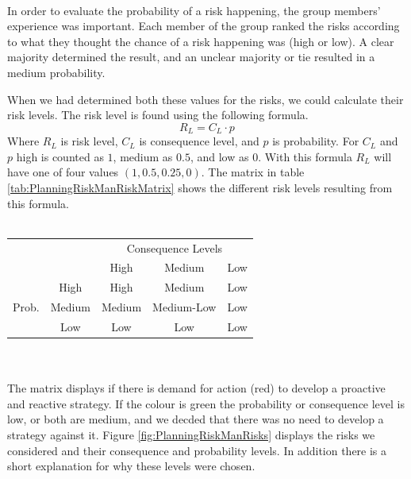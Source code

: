 \\%
In order to evaluate the probability of a risk happening, the group members' experience was important. Each member of the group ranked the risks according to what they thought the chance of a risk happening was (high or low). A clear majority determined the result, and an unclear majority or tie resulted in a medium probability.


When we had determined both these values for the risks, we could calculate their risk levels. The risk level is found using the following formula.
\begin{equation}
R_L = C_L \cdot p
\end{equation}
Where \( R_L \) is risk level, \( C_L \) is consequence level, and \( p \) is probability. For \( C_L \) and \( p \) high is counted as \( 1 \), medium as \( 0.5 \), and low as \( 0 \). With this formula \( R_L \) will have one of four values \( (1, 0.5, 0.25, 0) \). The matrix in table \ref{tab:PlanningRiskManRiskMatrix} shows the different risk levels resulting from this formula.\\%
\\%
\begin{minipage}{\linewidth}
\centering
\begin{tabular}{cc|c|c|c| }
  \cline{3-5}
  & & \multicolumn{3}{|c|}{Consequence Levels} \\ \cline{3-5}
  & & High & Medium & Low \\ \hline
  \multicolumn{1}{|c}{\multirow{3}{*}{Prob.}} & \multicolumn{1}{|c|}{High} & \cellcolor{red!30} High & \cellcolor{red!30} Medium & \cellcolor{green!15} Low \\ \cline{2-5}
  \multicolumn{1}{|c}{} & \multicolumn{1}{|c|}{Medium} & \cellcolor{red!30} Medium & \cellcolor{green!15} Medium-Low & \cellcolor{green!15} Low \\ \cline{2-5}
  \multicolumn{1}{|c}{} & \multicolumn{1}{|c|}{Low} & \cellcolor{green!15} Low & \cellcolor{green!15} Low & \cellcolor{green!15} Low \\ \cline{2-5}
  \hline
\end{tabular}
\end{minipage}\\%
\\%
The matrix displays if there is demand for action (red) to develop a proactive and reactive strategy. If the colour is green the probability or consequence level is low, or both are medium, and we decded that there was no need to develop a strategy against it. Figure \ref{fig:PlanningRiskManRisks} displays the risks we considered and their consequence and probability levels. In addition there is a short explanation for why these levels were chosen.

